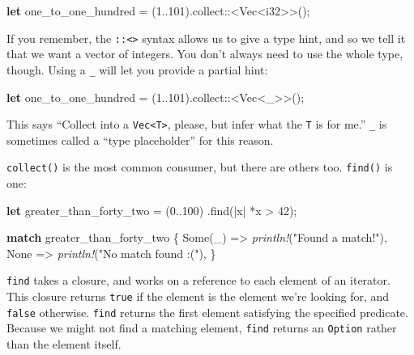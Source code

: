 \documentclass[a4paper,]{book}
\newenvironment{Shaded}{\begin{snugshade}}{\end{snugshade}}
\newcommand{\KeywordTok}[1]{\textcolor[rgb]{0.13,0.29,0.53}{\textbf{{#1}}}}
\newcommand{\DataTypeTok}[1]{\textcolor[rgb]{0.13,0.29,0.53}{{#1}}}
\newcommand{\DecValTok}[1]{\textcolor[rgb]{0.00,0.00,0.81}{{#1}}}
\newcommand{\ConstantTok}[1]{\textcolor[rgb]{0.00,0.00,0.00}{{#1}}}
\newcommand{\StringTok}[1]{\textcolor[rgb]{0.31,0.60,0.02}{{#1}}}
\newcommand{\PreprocessorTok}[1]{\textcolor[rgb]{0.56,0.35,0.01}{\textit{{#1}}}}
\newcommand{\NormalTok}[1]{{#1}}
\begin{document}
\begin{Shaded}
\begin{Highlighting}[]
\KeywordTok{let} \NormalTok{one_to_one_hundred = (}\DecValTok{1.}\NormalTok{.}\DecValTok{101}\NormalTok{).collect::<}\DataTypeTok{Vec}\NormalTok{<}\DataTypeTok{i32}\NormalTok{>>();}
\end{Highlighting}
\end{Shaded}

If you remember, the \texttt{::\textless{}\textgreater{}} syntax allows
us to give a type hint, and so we tell it that we want a vector of
integers. You don't always need to use the whole type, though. Using a
\texttt{\_} will let you provide a partial hint:

\begin{Shaded}
\begin{Highlighting}[]
\KeywordTok{let} \NormalTok{one_to_one_hundred = (}\DecValTok{1.}\NormalTok{.}\DecValTok{101}\NormalTok{).collect::<}\DataTypeTok{Vec}\NormalTok{<_>>();}
\end{Highlighting}
\end{Shaded}

This says ``Collect into a \texttt{Vec\textless{}T\textgreater{}},
please, but infer what the \texttt{T} is for me.'' \texttt{\_} is
sometimes called a ``type placeholder'' for this reason.

\texttt{collect()} is the most common consumer, but there are others
too. \texttt{find()} is one:

\begin{Shaded}
\begin{Highlighting}[]
\KeywordTok{let} \NormalTok{greater_than_forty_two = (}\DecValTok{0.}\NormalTok{.}\DecValTok{100}\NormalTok{)}
                             \NormalTok{.find(|x| *x > }\DecValTok{42}\NormalTok{);}

\KeywordTok{match} \NormalTok{greater_than_forty_two \{}
    \ConstantTok{Some}\NormalTok{(_) => }\PreprocessorTok{println!}\NormalTok{(}\StringTok{"Found a match!"}\NormalTok{),}
    \ConstantTok{None} \NormalTok{=> }\PreprocessorTok{println!}\NormalTok{(}\StringTok{"No match found :("}\NormalTok{),}
\NormalTok{\}}
\end{Highlighting}
\end{Shaded}

\texttt{find} takes a closure, and works on a reference to each element
of an iterator. This closure returns \texttt{true} if the element is the
element we're looking for, and \texttt{false} otherwise. \texttt{find}
returns the first element satisfying the specified predicate. Because we
might not find a matching element, \texttt{find} returns an
\texttt{Option} rather than the element itself.
\end{document}
